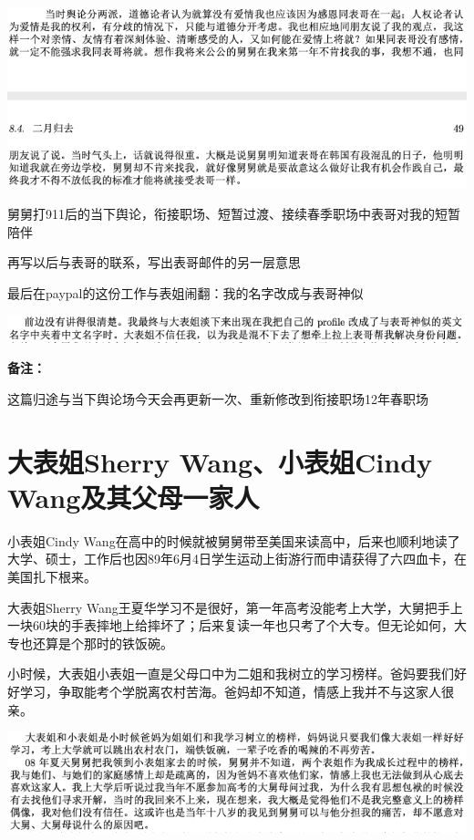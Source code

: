 \documentclass[9pt, b5paper]{article}
\begin{document}
\begin{center}
\includegraphics[width=.9\linewidth]{./pic/p1p49-2.png}
\end{center}

舅舅打911后的当下舆论，衔接职场、短暂过渡、接续春季职场中表哥对我的短暂陪伴

再写以后与表哥的联系，写出表哥邮件的另一层意思

最后在paypal的这份工作与表姐闹翻：我的名字改成与表哥神似

\begin{center}
\includegraphics[width=.9\linewidth]{./pic/p1p123-2.png}
\end{center}

\textbf{备注：}

这篇归途与当下舆论场今天会再更新一次、重新修改到衔接职场12年春职场


\section{大表姐Sherry Wang、小表姐Cindy Wang及其父母一家人}
\label{sec:orgf295abf}

小表姐Cindy Wang在高中的时候就被舅舅带至美国来读高中，后来也顺利地读了大学、硕士，工作后也因89年6月4日学生运动上街游行而申请获得了六四血卡，在美国扎下根来。

大表姐Sherry Wang王夏华学习不是很好，第一年高考没能考上大学，大舅把手上一块60块的手表摔地上给摔坏了；后来复读一年也只考了个大专。但无论如何，大专也还算是个那时的铁饭碗。

小时候，大表姐小表姐一直是父母口中为二姐和我树立的学习榜样。爸妈要我们好好学习，争取能考个学脱离农村苦海。爸妈却不知道，情感上我并不与这家人很亲。

\begin{center}
\includegraphics[width=.9\linewidth]{./pic/p1p123-3.png}
\end{center}
\end{document}
